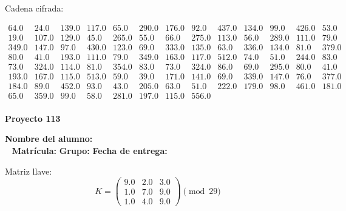 \documentclass[12pt]{article}
\begin{document}
Cadena cifrada:
\begin{center}
$\begin{array}{lllllllllllll}
64.0 & 24.0 & 139.0 & 117.0 & 65.0 & 290.0 & 176.0 & 92.0 & 437.0 & 134.0 & 99.0 & 426.0 & 53.0\\
19.0 & 107.0 & 129.0 & 45.0 & 265.0 & 55.0 & 66.0 & 275.0 & 113.0 & 56.0 & 289.0 & 111.0 & 79.0\\
349.0 & 147.0 & 97.0 & 430.0 & 123.0 & 69.0 & 333.0 & 135.0 & 63.0 & 336.0 & 134.0 & 81.0 & 379.0\\
80.0 & 41.0 & 193.0 & 111.0 & 79.0 & 349.0 & 163.0 & 117.0 & 512.0 & 74.0 & 51.0 & 244.0 & 83.0\\
73.0 & 324.0 & 114.0 & 81.0 & 354.0 & 83.0 & 73.0 & 324.0 & 86.0 & 69.0 & 295.0 & 80.0 & 41.0\\
193.0 & 167.0 & 115.0 & 513.0 & 59.0 & 39.0 & 171.0 & 141.0 & 69.0 & 339.0 & 147.0 & 76.0 & 377.0\\
184.0 & 89.0 & 452.0 & 93.0 & 43.0 & 205.0 & 63.0 & 51.0 & 222.0 & 179.0 & 98.0 & 461.0 & 181.0\\
65.0 & 359.0 & 99.0 & 58.0 & 281.0 & 197.0 & 115.0 & 556.0\\
\end{array}$
\end{center}

\newpage


\textbf{Proyecto 113}

\textbf{Nombre del alumno:} \underline{\hspace{13cm}}\\\
\vspace{1cm}
\textbf{Matrícula:} \underline{\hspace{4cm}} \hspace{1cm}
\textbf{Grupo:} \underline{\hspace{2cm}}
\textbf{Fecha de entrega:} \underline{\hspace{2cm}}

\medskip

Matriz llave:
\[
K = \begin{pmatrix}
9.0 & 2.0 & 3.0\\
1.0 & 7.0 & 9.0\\
1.0 & 4.0 & 9.0
\end{pmatrix} \pmod{29}
\]
\end{document}
